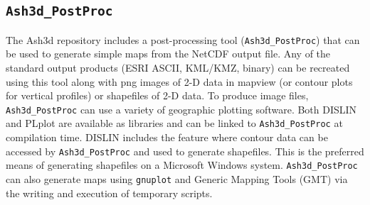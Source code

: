 \subsection{\texttt{Ash3d\_PostProc}}\label{ChapUsageSecPostProc_tool}
The Ash3d repository includes a post-processing tool (\texttt{Ash3d\_PostProc})
that can be used to generate simple maps from the NetCDF output file.
Any of the standard output products (ESRI ASCII, KML/KMZ, binary) can
be recreated using this tool along with png images of 2-D data in mapview
(or contour plots for vertical profiles) or shapefiles of 2-D data. To
produce image files, \texttt{Ash3d\_PostProc} can use a variety of geographic
plotting software. Both DISLIN and PLplot are available as libraries and can
be linked to \texttt{Ash3d\_PostProc} at compilation time. DISLIN includes
the feature where contour data can be accessed by \texttt{Ash3d\_PostProc}
and used to generate shapefiles. This is the preferred means of generating
shapefiles on a Microsoft Windows system. \texttt{Ash3d\_PostProc} can also
generate maps using \texttt{gnuplot} and Generic Mapping Tools (GMT) via
the writing and execution of temporary scripts.

